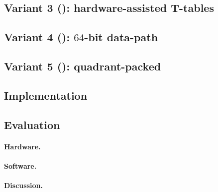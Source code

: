 \documentclass[preprint]{iacrtrans}
\begin{document}
\subsection{Variant 3 (): hardware-assisted T-tables}
\label{sec:ise:design:v3}

\subsection{Variant 4 (): $64$-bit data-path}
\label{sec:ise:design:v4}

\subsection{Variant 5 (): quadrant-packed}
\label{sec:ise:design:v5}


%



\subsection{Implementation}
\label{sec:ise:imp}



\subsection{Evaluation}

\paragraph{Hardware.}
\label{sec:ise:eval:hw}


\paragraph{Software.}
\label{sec:ise:eval:sw}


\paragraph{Discussion.}
\label{sec:ise:eval:discuss}


\end{document}
